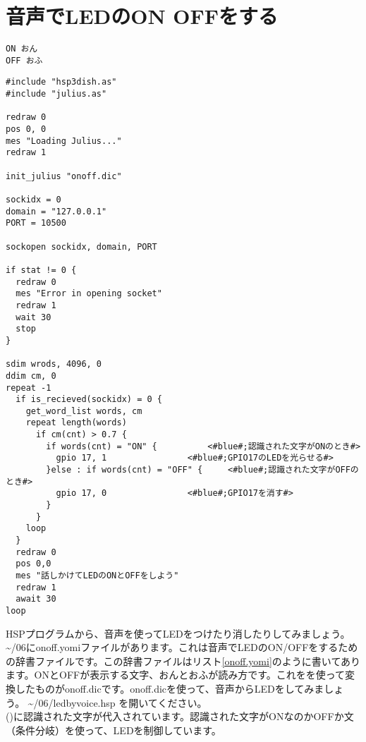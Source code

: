 \newpage
\section{音声でLEDのON OFFをする}

\begin{lstlisting}[caption=onoff.yomi,label=onoff.yomi]
ON おん
OFF おふ
\end{lstlisting}

\begin{lstlisting}[caption=ledbyvoice.hsp,label=ledbyvoice.hsp]
#include "hsp3dish.as"
#include "julius.as"

redraw 0
pos 0, 0
mes "Loading Julius..."
redraw 1

init_julius "onoff.dic"

sockidx = 0
domain = "127.0.0.1"
PORT = 10500

sockopen sockidx, domain, PORT

if stat != 0 {
  redraw 0
  mes "Error in opening socket"
  redraw 1
  wait 30
  stop
}

sdim wrods, 4096, 0
ddim cm, 0
repeat -1
  if is_recieved(sockidx) = 0 {
    get_word_list words, cm
    repeat length(words)
      if cm(cnt) > 0.7 {
        if words(cnt) = "ON" {			<#blue#;認識された文字がONのとき#>
          gpio 17, 1				<#blue#;GPIO17のLEDを光らせる#>
        }else : if words(cnt) = "OFF" {		<#blue#;認識された文字がOFFのとき#>
          gpio 17, 0				<#blue#;GPIO17を消す#>
        }
      }
    loop
  }
  redraw 0
  pos 0,0
  mes "話しかけてLEDのONとOFFをしよう"
  redraw 1
  await 30
loop
\end{lstlisting}

HSPプログラムから、音声を使ってLEDをつけたり消したりしてみましょう。 \textasciitilde /06にonoff.yomiファイルがあります。これは音声でLEDのON/OFFをするための辞書ファイルです。この辞書ファイルはリスト\ref{onoff.yomi}のように書いてあります。ONとOFFが表示する文字、おんとおふが読み方です。これをを使って変換したものがonoff.dicです。onoff.dicを使って、音声からLEDをしてみましょう。 \textasciitilde /06/ledbyvoice.hsp を開いてください。\\

()に認識された文字が代入されています。認識された文字がONなのかOFFか文（条件分岐）を使って、LEDを制御しています。\\

\begin{tcolorbox}[title=\useOmetoi]
\begin{enumerate}
\end{enumerate}
\end{tcolorbox}
